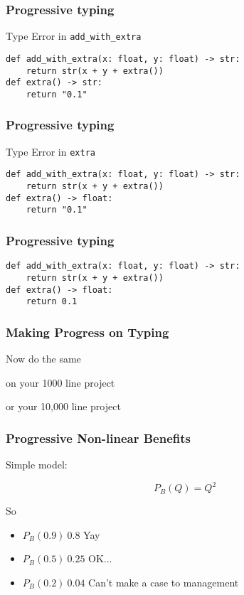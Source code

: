 \begin{frame}[fragile]
\frametitle{Progressive typing}
Type Error in \verb|add_with_extra|
\begin{lstlisting}
def add_with_extra(x: float, y: float) -> str:
    return str(x + y + extra())
def extra() -> str:
    return "0.1"
\end{lstlisting}
\end{frame}

\begin{frame}[fragile]
\frametitle{Progressive typing}
Type Error in \verb|extra|
\begin{lstlisting}
def add_with_extra(x: float, y: float) -> str:
    return str(x + y + extra())
def extra() -> float:
    return "0.1"
\end{lstlisting}
\end{frame}

\begin{frame}[fragile]
\frametitle{Progressive typing}
\begin{lstlisting}
def add_with_extra(x: float, y: float) -> str:
    return str(x + y + extra())
def extra() -> float:
    return 0.1
\end{lstlisting}
\end{frame}

\begin{frame}[fragile]
\frametitle{Making Progress on Typing}

Now do the same\pause

on your 1000 line project\pause

or your 10,000 line project
\end{frame}

\begin{frame}[fragile]
\frametitle{Progressive Non-linear Benefits}

Simple model:

\[

P_B(Q) = Q^2

\]

So

\begin{itemize}

\item $P_B(0.9) ~ 0.8$ Yay \pause
\item $P_B(0.5) ~ 0.25$ OK... \pause
\item $P_B(0.2) ~ 0.04$ Can't make a case to management

\end{itemize}

\end{frame}

